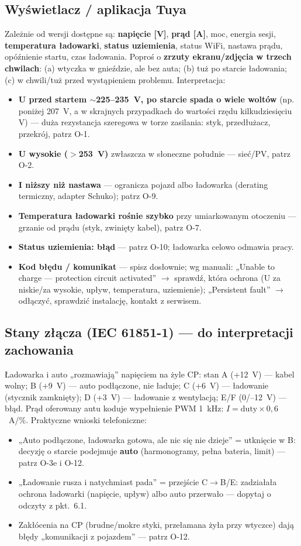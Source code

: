 \documentclass[11pt]{article}
\newcommand{\key}[1]{\textbf{\color{navy}#1}}
\begin{document}
\subsection{Wyświetlacz / aplikacja Tuya}
Zależnie od wersji dostępne są: \key{napięcie [V]}, \key{prąd [A]}, moc, energia sesji, \key{temperatura ładowarki}, \key{status uziemienia}, status WiFi, nastawa prądu, opóźnienie startu, czas ładowania. Poproś o \key{zrzuty ekranu/zdjęcia w trzech chwilach}: (a) wtyczka w gnieździe, ale bez auta; (b) tuż po starcie ładowania; (c) w chwili/tuż przed wystąpieniem problemu. Interpretacja:
\begin{itemize}
\item \key{U przed startem $\sim$225--235~V, po starcie spada o wiele woltów} (np. poniżej 207~V, a w skrajnych przypadkach do wartości rzędu kilkudziesięciu V) — duża rezystancja szeregowa w torze zasilania: styk, przedłużacz, przekrój, patrz O-1.
\item \key{U wysokie ($>$253~V)} zwłaszcza w słoneczne południe — sieć/PV, patrz O-2.
\item \key{I niższy niż nastawa} — ogranicza pojazd albo ładowarka (derating termiczny, adapter Schuko); patrz O-9.
\item \key{Temperatura ładowarki rośnie szybko} przy umiarkowanym otoczeniu — grzanie od prądu (styk, zwinięty kabel), patrz O-7.
\item \key{Status uziemienia: błąd} — patrz O-10; ładowarka celowo odmawia pracy.
\item \key{Kod błędu / komunikat} — spisz dosłownie; wg manuali: „Unable to charge — protection circuit activated'' $\rightarrow$ sprawdź, która ochrona (U za niskie/za wysokie, upływ, temperatura, uziemienie); „Persistent fault'' $\rightarrow$ odłączyć, sprawdzić instalację, kontakt z serwisem.
\end{itemize}

\subsection{Stany złącza (IEC 61851-1) — do interpretacji zachowania}
Ładowarka i auto „rozmawiają'' napięciem na żyle CP: stan A (+12~V) — kabel wolny; B (+9~V) — auto podłączone, nie ładuje; C (+6~V) — ładowanie (stycznik zamknięty); D (+3~V) — ładowanie z wentylacją; E/F (0/--12~V) — błąd. Prąd oferowany autu koduje wypełnienie PWM 1~kHz: $I=\mathrm{duty}\times0{,}6$~A/\%. Praktyczne wnioski telefoniczne:
\begin{itemize}
\item „Auto podłączone, ładowarka gotowa, ale nic się nie dzieje'' = utknięcie w B: decyzję o starcie podejmuje \key{auto} (harmonogramy, pełna bateria, limit) — patrz O-3e i O-12.
\item „Ładowanie rusza i natychmiast pada'' = przejście C$\rightarrow$B/E: zadziałała ochrona ładowarki (napięcie, upływ) albo auto przerwało — dopytaj o odczyty z pkt.~6.1.
\item Zakłócenia na CP (brudne/mokre styki, przełamana żyła przy wtyczce) dają błędy „komunikacji z pojazdem'' — patrz O-12.
\end{itemize}
\end{document}
